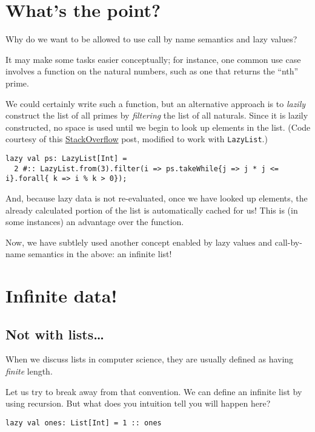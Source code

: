 \documentclass[11pt]{article}
\begin{document}
\section{What's the point?}
\label{sec:org8363a6f}

Why do we want to be allowed to use call by name semantics
and lazy values?

It may make some tasks easier conceptually;
for instance, one common use case involves a function
on the natural numbers, such as one that returns the “nth” prime.

We could certainly write such a function,
but an alternative approach is to \emph{lazily} construct
the list of all primes by \emph{filtering} the list of all naturals.
Since it is lazily constructed, no space is used
until we begin to look up elements in the list.
(Code courtesy of this \href{https://stackoverflow.com/q/15594227/2041536}{StackOverflow} post,
modified to work with \texttt{LazyList}.)
\begin{verbatim}
lazy val ps: LazyList[Int] =
  2 #:: LazyList.from(3).filter(i => ps.takeWhile{j => j * j <= i}.forall{ k => i % k > 0});
\end{verbatim}

And, because lazy data is not re-evaluated,
once we have looked up elements, the already calculated portion
of the list is automatically cached for us!
This is (in some instances) an advantage over the function.

Now, we have subtlely used another concept enabled by lazy values
and call-by-name semantics in the above: an infinite list!

\section{Infinite data!}
\label{sec:org8e94b3b}

\subsection{Not with lists…}
\label{sec:orgadc97be}

When we discuss lists in computer science,
they are usually defined as having \emph{finite} length.

Let us try to break away from that convention.
We can define an infinite list by using recursion.
But what does you intuition tell you will happen here?
\begin{verbatim}
lazy val ones: List[Int] = 1 :: ones
\end{verbatim}
\end{document}
